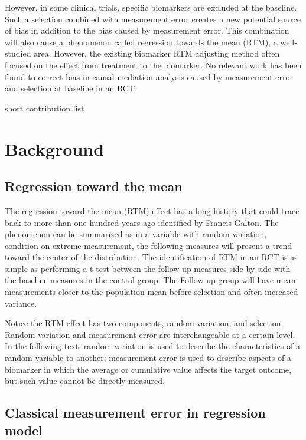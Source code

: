 \documentclass{article}
\begin{document}
However, in some clinical trials, specific biomarkers are excluded at the baseline. Such a selection combined with measurement error creates a new potential source of bias in addition to the bias caused by measurement error. This combination will also cause a phenomenon called regression towards the mean (RTM), a well-studied area. However, the existing biomarker RTM adjusting method often focused on the effect from treatment to the biomarker. No relevant work has been found to correct bias in causal mediation analysis caused by measurement error and selection at baseline in an RCT. 

short contribution list



\section{Background}

\subsection{Regression toward the mean}

The regression toward the mean (RTM) effect has a long history that could trace back to more than one hundred years ago identified by Francis Galton. The phenomenon can be summarized as in a variable with random variation, condition on extreme measurement, the following measures will present a trend toward the center of the distribution. The identification of RTM in an RCT is as simple as performing a t-test between the follow-up measures side-by-side with the baseline measures in the control group. The Follow-up group will have mean measurements closer to the population mean before selection and often increased variance. 

Notice the RTM effect has two components, random variation, and selection. Random variation and measurement error are interchangeable at a certain level. In the following text, random variation is used to describe the characteristics of a random variable to another; measurement error is used to describe aspects of a biomarker in which the average or cumulative value affects the target outcome, but such value cannot be directly measured.

\subsection{Classical measurement error in regression model}
\end{document}
